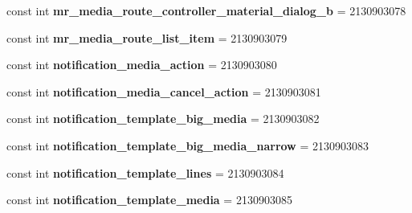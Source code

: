 \begin{DoxyCompactItemize}
\item 
\hypertarget{classClient_1_1Droid_1_1Resource_1_1Layout_aeacc6f588f7b83cd808ea8cc3f063e84}{}const int {\bfseries mr\+\_\+media\+\_\+route\+\_\+controller\+\_\+material\+\_\+dialog\+\_\+b} = 2130903078\label{classClient_1_1Droid_1_1Resource_1_1Layout_aeacc6f588f7b83cd808ea8cc3f063e84}

\item 
\hypertarget{classClient_1_1Droid_1_1Resource_1_1Layout_a0ce3462dc8471ee3736c2dfb87918d7f}{}const int {\bfseries mr\+\_\+media\+\_\+route\+\_\+list\+\_\+item} = 2130903079\label{classClient_1_1Droid_1_1Resource_1_1Layout_a0ce3462dc8471ee3736c2dfb87918d7f}

\item 
\hypertarget{classClient_1_1Droid_1_1Resource_1_1Layout_a6599dbc7ec352b76575361dfe96e2c07}{}const int {\bfseries notification\+\_\+media\+\_\+action} = 2130903080\label{classClient_1_1Droid_1_1Resource_1_1Layout_a6599dbc7ec352b76575361dfe96e2c07}

\item 
\hypertarget{classClient_1_1Droid_1_1Resource_1_1Layout_aa4f5e10a92e7b401f10f8a61c69ae01f}{}const int {\bfseries notification\+\_\+media\+\_\+cancel\+\_\+action} = 2130903081\label{classClient_1_1Droid_1_1Resource_1_1Layout_aa4f5e10a92e7b401f10f8a61c69ae01f}

\item 
\hypertarget{classClient_1_1Droid_1_1Resource_1_1Layout_acd3fa239064a0733e1aa575abe35585b}{}const int {\bfseries notification\+\_\+template\+\_\+big\+\_\+media} = 2130903082\label{classClient_1_1Droid_1_1Resource_1_1Layout_acd3fa239064a0733e1aa575abe35585b}

\item 
\hypertarget{classClient_1_1Droid_1_1Resource_1_1Layout_a147f06c468bba227492c3115bc8e3299}{}const int {\bfseries notification\+\_\+template\+\_\+big\+\_\+media\+\_\+narrow} = 2130903083\label{classClient_1_1Droid_1_1Resource_1_1Layout_a147f06c468bba227492c3115bc8e3299}

\item 
\hypertarget{classClient_1_1Droid_1_1Resource_1_1Layout_a747e17ca3d2874ea9efd82a8e08aa770}{}const int {\bfseries notification\+\_\+template\+\_\+lines} = 2130903084\label{classClient_1_1Droid_1_1Resource_1_1Layout_a747e17ca3d2874ea9efd82a8e08aa770}

\item 
\hypertarget{classClient_1_1Droid_1_1Resource_1_1Layout_ab5efcb972b6f7ba418e778a7666f04ba}{}const int {\bfseries notification\+\_\+template\+\_\+media} = 2130903085\label{classClient_1_1Droid_1_1Resource_1_1Layout_ab5efcb972b6f7ba418e778a7666f04ba}


\end{DoxyCompactItemize}
